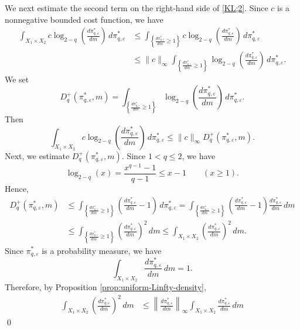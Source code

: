 \documentclass[a4paper,11pt]{article}
\theoremstyle{plain}
\theoremstyle{definition}
\theoremstyle{remark}
\theoremstyle{plain}
\newenvironment{pf}[1]
{{\noindent\textbf{Proof of #1.}}}{\hfill \qed}
\numberwithin{equation}{section}
\newcommand{\ep}{\varepsilon}
\newcommand{\1}{\mbox{1}\hspace{-0.25em}\mbox{l}} %
\begin{document}
\begin{pf}{Theorem \ref{thm;3}}
We next estimate the second term on the right-hand side of \eqref{KL;2}. Since $c$ is a nonnegative bounded cost function, we have
\begin{align*}
\int_{X_1 \times X_2} c \log_{2-q}\left(\frac{d\pi_{q,\ep}^*}{dm}\right)\, d\pi_{q,\ep}^* 
&\leq \int_{\left\{ \frac{d\pi_{q,\ep}^*}{dm} \geq 1 \right\}} c \log_{2-q}\left(\frac{d\pi_{q,\ep}^*}{dm}\right)\, d\pi_{q,\ep}^* \\ 
&\leq \|c\|_\infty \int_{\left\{ \frac{d\pi_{q,\ep}^*}{dm} \geq 1 \right\}} \log_{2-q}\left(\frac{d\pi_{q,\ep}^*}{dm}\right)\,d\pi_{q,\ep}^*.
\end{align*}
We set
\begin{equation*}
D_q^+(\pi_{q,\ep}^*, m) = \int_{\left\{
\frac{d\pi_{q,\ep}^*}{dm} \geq 1
\right\}}
\log_{2-q}\left(\frac{d\pi_{q,\ep}^*}{dm}\right)\, d\pi_{q,\ep}^*.
\end{equation*}
Then
\begin{equation}\label{KL;3}
  \int_{X_1 \times X_2}
  c \log_{2-q}\left(\frac{d\pi_{q,\ep}^*}{dm}\right)\, d\pi_{q,\ep}^*
  \leq \|c\|_\infty D_q^+(\pi_{q,\ep}^*, m).
\end{equation}
Next, we estimate $D_q^+(\pi_{q,\ep}^*, m)$. Since $1<q\leq 2$, we have
\begin{equation*}
  \log_{2-q}(x)
  = \frac{x^{q-1}-1}{q-1}
  \leq x-1
  \qquad (x \geq 1).
\end{equation*}
Hence,
\begin{align*}
  D_q^+(\pi_{q,\ep}^*, m)
  &\leq \int_{\left\{
  \frac{d\pi_{q,\ep}^*}{dm} \geq 1
  \right\}}
  \left(
  \frac{d\pi_{q,\ep}^*}{dm} - 1
  \right)\, d\pi_{q,\ep}^* 
  = \int_{\left\{
  \frac{d\pi_{q,\ep}^*}{dm} \geq 1
  \right\}}
  \left(
  \frac{d\pi_{q,\ep}^*}{dm} - 1
  \right)
  \frac{d\pi_{q,\ep}^*}{dm}
  \, dm \\
  &\leq \int_{\left\{
  \frac{d\pi_{q,\ep}^*}{dm} \geq 1
  \right\}}
  \left(
  \frac{d\pi_{q,\ep}^*}{dm}
  \right)^2
  \, dm 
  \leq \int_{X_1 \times X_2}
  \left(
  \frac{d\pi_{q,\ep}^*}{dm}
  \right)^2
  \, dm.
\end{align*}
Since $\pi_{q,\ep}^*$ is a probability measure, we have
\begin{equation*}
\int_{X_1 \times X_2}
\frac{d\pi_{q,\ep}^*}{dm}
\, dm
= 1.
\end{equation*}
Therefore, by Proposition \ref{prop:uniform-Linfty-density},
\begin{align*}
  \int_{X_1 \times X_2}
  \left( \frac{d\pi_{q,\ep}^*}{dm} \right)^2 \, dm &\leq \left\| \frac{d\pi_{q,\ep}^*}{dm} \right\|_\infty \int_{X_1 \times X_2} \frac{d\pi_{q,\ep}^*}{dm} \, dm 

\end{align*}
\end{pf}
\end{document}
